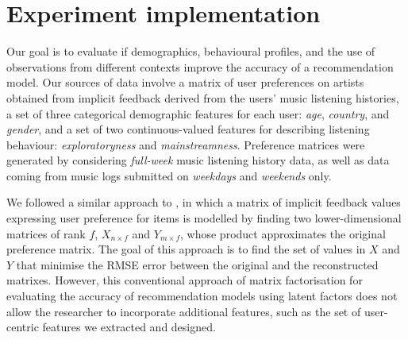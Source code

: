 




















\section{Experiment implementation}\label{sec:6-experiment-implementation}
Our goal is to evaluate if demographics, behavioural profiles, and the use of observations from different contexts improve the accuracy of a recommendation model.
Our sources of data involve a matrix of user preferences on artists obtained from  implicit feedback derived from the users' music listening histories, 
a set of three categorical demographic features for each user: \emph{age}, \emph{country}, and \emph{gender}, and a set of two continuous-valued features for describing listening behaviour: \emph{exploratoryness} and  \emph{mainstreamness}. Preference matrices were generated by considering \textit{full-week} music listening history data, as well as data coming from music logs submitted on \textit{weekdays} and \textit{weekends} only.

We followed a similar approach to \textcite{koren09matrix}, in which a matrix of implicit feedback values expressing user preference for items is modelled by finding two lower-dimensional matrices of rank $f$, $X_{n\times{f}}$ and $Y_{m\times{f}}$, whose product approximates the original preference matrix. The goal of this approach is to find the set of values in $X$ and $Y$ that minimise the RMSE error between the original and the reconstructed matrixes. 
However, this conventional approach of matrix factorisation for evaluating the accuracy of recommendation models using latent factors does not allow the researcher to incorporate additional features, such as the set of user-centric features we extracted and designed. 

